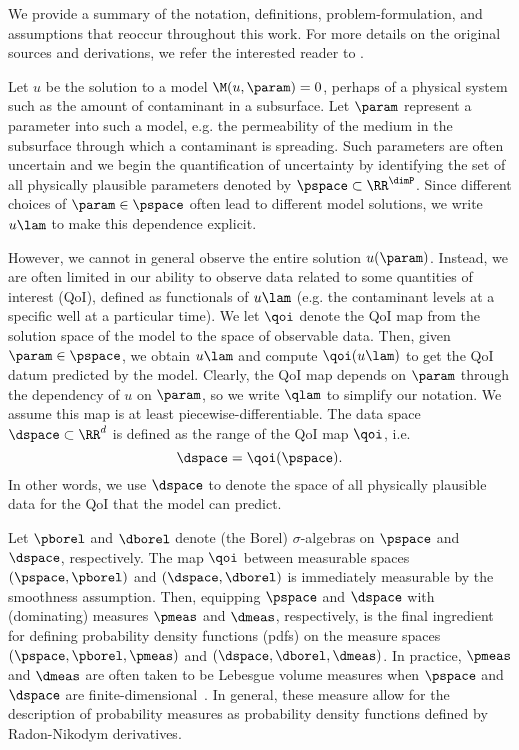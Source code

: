 We provide a summary of the notation, definitions, problem-formulation, and assumptions that reoccur throughout this work. 
For more details on the original sources and derivations,  we refer the interested reader to \cite{BES12, BE13, BET+14}.

Let $u$ be the solution to a model $\M(u, \param) = 0$, perhaps of a physical system such as the amount of contaminant in a subsurface.
Let $\param$ represent a parameter into such a model, e.g. the permeability of the medium in the subsurface through which a contaminant is spreading.
Such parameters are often uncertain and we begin the quantification of uncertainty by identifying the set of all physically plausible parameters denoted by $\pspace\subset\RR^\dimP$.
Since different choices of $\param \in \pspace$ often lead to different model solutions, we write $u\lam$ to make this dependence explicit.

However, we cannot in general observe the entire solution $u(\param)$.
Instead, we are often limited in our ability to observe data related to some quantities of interest (QoI), defined as functionals of $u\lam$ (e.g. the contaminant levels at a specific well at a particular time).
We let $\qoi$ denote the QoI map from the solution space of the model to the space of observable data.
Then, given $\param \in \pspace$, we obtain $u\lam$ and compute $\qoi(u\lam)$ to get the QoI datum predicted by the model.
Clearly, the QoI map depends on $\param$ through the dependency of $u$ on $\param$, so we write $\qlam$ to simplify our notation.
We assume this map is at least piecewise-differentiable.
The data space $\dspace \subset \RR^d$ is defined as the range of the QoI map $\qoi$, i.e.
\[
\dspace = \qoi(\pspace).
\]
In other words, we use $\dspace$ to denote the space of all physically plausible data for the QoI that the model can predict.


Let $\pborel$ and $\dborel$ denote (the Borel) $\sigma$-algebras on $\pspace$ and $\dspace$, respectively.
The map $\qoi$ between measurable spaces $(\pspace, \pborel)$ and $(\dspace, \dborel)$ is immediately measurable by the smoothness assumption.
Then, equipping $\pspace$ and $\dspace$ with (dominating) measures $\pmeas$ and $\dmeas$, respectively, is the final ingredient for defining probability density functions (pdfs) on the measure spaces $(\pspace, \pborel, \pmeas)$ and $(\dspace, \dborel, \dmeas)$.
In practice, $\pmeas$ and $\dmeas$ are often taken to be Lebesgue volume measures when $\pspace$ and $\dspace$ are finite-dimensional~\cite{BET+14, BJW18}.
In general, these measure allow for the description of probability measures as probability density functions defined by Radon-Nikodym derivatives.


